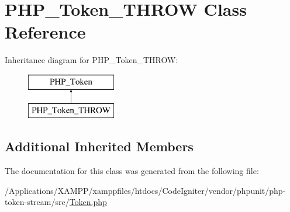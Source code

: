 \hypertarget{class_p_h_p___token___t_h_r_o_w}{}\section{P\+H\+P\+\_\+\+Token\+\_\+\+T\+H\+R\+OW Class Reference}
\label{class_p_h_p___token___t_h_r_o_w}
Inheritance diagram for P\+H\+P\+\_\+\+Token\+\_\+\+T\+H\+R\+OW\+:\begin{figure}[H]
\begin{center}
\leavevmode
\includegraphics[height=2.000000cm]{class_p_h_p___token___t_h_r_o_w}
\end{center}
\end{figure}
\subsection*{Additional Inherited Members}


The documentation for this class was generated from the following file\+:\begin{DoxyCompactItemize}
\item 
/\+Applications/\+X\+A\+M\+P\+P/xamppfiles/htdocs/\+Code\+Igniter/vendor/phpunit/php-\/token-\/stream/src/\mbox{\hyperlink{_token_8php}{Token.\+php}}\end{DoxyCompactItemize}

